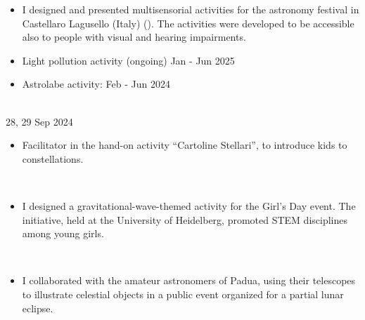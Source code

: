 \begin{experiences}
    \emptySeparator
    {
     \begin{itemize}
         \item I designed and presented multisensorial activities for the astronomy festival in Castellaro Lagusello (Italy) (). The activities were developed to be accessible also to people with visual and hearing impairments.
         \item Light pollution activity (ongoing) \hfill Jan - Jun 2025
         \item Astrolabe activity:  \hfill Feb - Jun 2024
     \end{itemize}}
    \\
     {28, 29 Sep 2024}%
    {
     \begin{itemize}
         \item Facilitator in the hand-on activity ``Cartoline Stellari'', to introduce kids to constellations.
     \end{itemize}}
     \\
    {
     \begin{itemize}
         \item I designed a gravitational-wave-themed activity for the Girl's Day event. The initiative, held at the University of Heidelberg, promoted STEM disciplines among young girls.
     \end{itemize}}
     \\
    {
     \begin{itemize}
         \item I collaborated with the amateur astronomers of Padua, using their telescopes to illustrate celestial objects in a public event organized for a partial lunar eclipse.
     \end{itemize}}
    \emptySeparator
         

\end{experiences}
